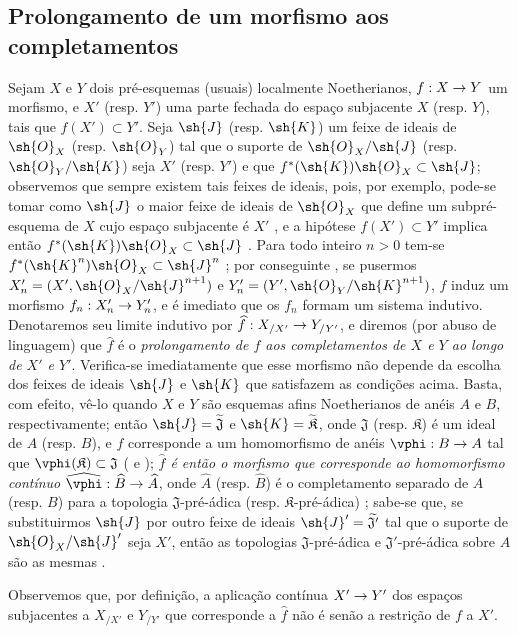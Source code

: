 \documentclass[oneside]{amsart}
\makeatletter
\newcommand{\ega@arrow}[2]{\mathchoice{#1}{#2}{#2}{#2}}
\renewcommand{\to}{\ega@arrow{\longrightarrow}{\rightarrow}}
\newcommand{\oldpage}[2][]{{\marginnote{\normalfont\textbf{#1}~|~#2}}\ignorespaces}
\let\EGAOriginalLabel\label
\renewcommand{\label}[1]{\phantomsection\EGAOriginalLabel{#1}}
\makeatother
\begin{document}
\subsection{Prolongamento de um morfismo aos completamentos}
\label{subsection:I.10.9}

\begin{env}[10.9.1]
\label{I.10.9.1}
Sejam $X$ e $Y$ dois pré-esquemas (usuais) localmente Noetherianos, $f:X\to Y$ um morfismo, e $X'$ (resp. $Y'$) uma parte fechada do espaço subjacente $X$ (resp. $Y$), tais que $f(X')\subset Y'$.
Seja $\sh{J}$ (resp. $\sh{K}$) um feixe de ideais de $\sh{O}_X$ (resp. $\sh{O}_Y$) tal que o suporte de $\sh{O}_X/\sh{J}$ (resp. $\sh{O}_Y/\sh{K}$) seja $X'$ (resp. $Y'$) e que $f^*(\sh{K})\sh{O}_X\subset\sh{J}$; observemos que sempre existem tais feixes de ideais, pois, por exemplo, pode-se tomar como $\sh{J}$ o maior feixe de ideais de $\sh{O}_X$ que define um subpré-esquema de $X$ cujo espaço subjacente é $X'$ , e a hipótese $f(X')\subset Y'$ implica então $f^*(\sh{K})\sh{O}_X\subset\sh{J}$ .
Para todo inteiro $n>0$ tem-se $f^*(\sh{K}^n)\sh{O}_X\subset\sh{J}^n$ ; por conseguinte , se pusermos $X_n'=(X',\sh{O}_X/\sh{J}^{n+1})$ e $Y_n'=(Y',\sh{O}_Y/\sh{K}^{n+1})$, $f$ induz um morfismo $f_n:X_n'\to Y_n'$, e é imediato que os $f_n$ formam um sistema indutivo.
Denotaremos seu limite indutivo  por $\widehat{f}:X_{/X'}\to Y_{/Y'}$, e diremos (por abuso de linguagem) que $\widehat{f}$ é o \emph{prolongamento de $f$ aos completamentos de $X$ e $Y$ ao longo de $X'$ e $Y'$}.
Verifica-se imediatamente que esse morfismo não depende da escolha dos feixes de ideais $\sh{J}$ e $\sh{K}$ que satisfazem as condições acima.
Basta, com efeito, vê-lo quando $X$ e $Y$ são esquemas afins Noetherianos de anéis $A$ e $B$, respectivamente; então $\sh{J}=\widetilde{\mathfrak{J}}$ e $\sh{K}=\widetilde{\mathfrak{K}}$, onde $\mathfrak{J}$ (resp. $\mathfrak{K}$) é um ideal de $A$ (resp. $B$), e $f$ corresponde a um homomorfismo de anéis $\vphi:B\to A$ tal que $\vphi(\mathfrak{K})\subset\mathfrak{J}$ ( e ); \emph{$\widehat{f}$ é então o morfismo que corresponde  ao homomorfismo contínuo $\widehat{\vphi}:\widehat{B}\to\widehat{A}$}, onde $\widehat{A}$ (resp. $\widehat{B}$) é o completamento separado de $A$ (resp. $B$) para a topologia $\mathfrak{J}$-pré-ádica (resp. $\mathfrak{K}$-pré-ádica) ; sabe-se que, se substituirmos $\sh{J}$ por outro
\oldpage[I]{199}
feixe de ideais $\sh{J}'=\widetilde{\mathfrak{J}'}$ tal que o suporte de $\sh{O}_X/\sh{J}'$ seja $X'$, então as topologias $\mathfrak{J}$-pré-ádica e $\mathfrak{J}'$-pré-ádica sobre $A$ são as mesmas .

Observemos que, por definição, a aplicação contínua $X'\to Y'$ dos espaços subjacentes a $X_{/X'}$ e $Y_{/Y'}$ que corresponde a $\widehat{f}$ não é senão a restrição de $f$ a $X'$.
\end{env}
\end{document}
